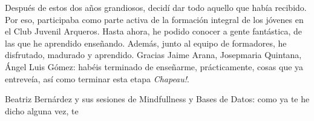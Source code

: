 Después de estos dos años grandiosos, decidí dar todo aquello que había recibido. Por eso, participaba como parte activa de la formación integral de los jóvenes en el Club Juvenil Arqueros. Hasta ahora, he podido conocer a gente fantástica, de las que he aprendido enseñando. Además, junto al equipo de formadores, he disfrutado, madurado y aprendido. Gracias Jaime Arana, Josepmaria Quintana, Ángel Luis Gómez: habéis terminado de enseñarme, prácticamente, cosas que ya entreveía, así como terminar esta etapa \textit{Chapeau!}.

Beatriz Bernárdez y sus sesiones de Mindfullness y Bases de Datos: como ya te he dicho alguna vez, te 

